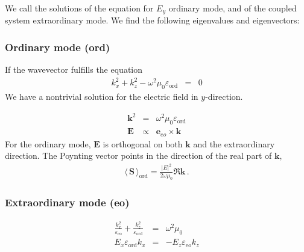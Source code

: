 \documentclass[12pt,a4paper,twoside,openright,BCOR10mm,headsepline,titlepage,abstracton,chapterprefix,final]{scrreprt}
\newcommand\Vector[1]{{\mathbf{#1}}}
\newcommand\vacuum{0}
\newcommand\wavenumber{k}
\newcommand\Wavevector{\Vector{\wavenumber}}
\newcommand\scalarEfield{E}
\newcommand\Efield{\Vector{\scalarEfield}}
\newcommand\vacuumpermeability{\scalarpermeability_{\vacuum}}
\newcommand\scalarpermeability{\mu}
\newcommand\scalarpermittivity{\varepsilon}
\newcommand\ordi{\text{ord}}
\newcommand\eo{\text{eo}}
\newcommand{\timeavg}[1]{{\langle\,#1\,\rangle}}
\begin{document}
We call the solutions of the equation for $\scalarEfield_y$ ordinary mode, and of the coupled system extraordinary mode.
We find the following eigenvalues and eigenvectors:
\subsubsection{Ordinary mode (ord)}

If the wavevector fulfills the equation
\begin{eqnarray}
  \wavenumber_x^2 + \wavenumber_z^2 - \omega^2 \vacuumpermeability \scalarpermittivity_{\ordi} &=& 0 
\end{eqnarray}
We have a nontrivial solution for the electric field in $y$-direction.

\begin{eqnarray}
 \Wavevector^2 &=& \omega^2 \vacuumpermeability \scalarpermittivity_{\ordi} 
 \\
 \Efield &\propto& \Vector{e}_{eo} \times \Wavevector
\end{eqnarray}
For the ordinary mode, $\Efield$ is orthogonal on both $\Wavevector$ and the extraordinary direction.
The Poynting vector points in the direction of the real part of $\Wavevector$,
\begin{eqnarray}
 \timeavg{\Vector{S}}_\ordi = \frac{ |\scalarEfield|^2 }{ 2\omega\vacuumpermeability } \Re \Wavevector\,.\label{eq:Suniaxialordi}
\end{eqnarray}


\subsubsection{Extraordinary mode (eo)}
\begin{eqnarray}
  \frac{\wavenumber_{x}^2 }{\scalarpermittivity_{\eo} } + \frac{\wavenumber_{z}^2 }{\scalarpermittivity_{\ordi} } &=& \omega^2 \vacuumpermeability 
  \label{eq:uniaxialAnisotropicDispersion}
  \\
  \scalarEfield_x \scalarpermittivity_{\ordi} \wavenumber_x &=& -  \scalarEfield_z \scalarpermittivity_{\eo} \wavenumber_z \label{eq:divDuniaxial}
\end{eqnarray}
\end{document}
